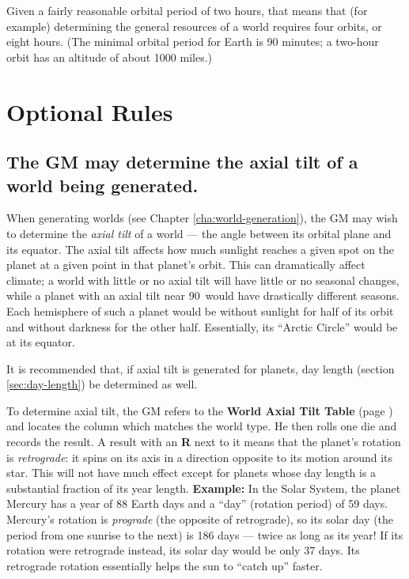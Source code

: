 Given a fairly reasonable orbital period of two hours, that means that
(for example) determining the general resources of a world requires
four orbits, or eight hours.  (The minimal orbital period for Earth is
90 minutes; a two-hour orbit has an altitude of about 1000 miles.)




\section{Optional Rules}
\label{sec:optional-rules}



\subsection[World Axial Tilt]{The GM may determine the axial tilt of a
  world being generated.}
\label{sec:world-axial-tilt}

When generating worlds (see Chapter \ref{cha:world-generation}), the
GM may wish to determine the \emph{axial tilt} of a world --- the
angle between its orbital plane and its equator.  The axial tilt
affects how much sunlight reaches a given spot on the planet at a
given point in that planet's orbit.  This can dramatically affect
climate; a world with little or no axial tilt will have little or no
seasonal changes, while a planet with an axial tilt near 90\textdegree\
would have drastically different seasons.  Each hemisphere of such a
planet would be without sunlight for half of its orbit and without
darkness for the other half.  Essentially, its ``Arctic Circle'' would
be at its equator.

It is recommended that, if axial tilt is generated for planets, day
length (section \ref{sec:day-length}) be determined as well.

To determine axial tilt, the GM refers to the \textbf{World Axial Tilt
  Table} (page \pageref{tab:axial-tilt}) and locates the column which
matches the world type.  He then rolls one die and records the result.
A result with an \textbf{R} next to it means that the planet's
rotation is \emph{retrograde}: it spins on its axis in a direction
opposite to its motion around its star.  This will not have much
effect except for planets whose day length is a substantial fraction
of its year length.  \textbf{Example:} In the Solar System, the planet
Mercury has a year of 88 Earth days and a ``day'' (rotation period) of
59 days.  Mercury's rotation is \emph{prograde} (the opposite of
retrograde), so its solar day (the period from one sunrise to the
next) is 186 days --- twice as long as its year!  If its rotation were
retrograde instead, its solar day would be only 37 days.  Its
retrograde rotation essentially helps the sun to ``catch up'' faster.

